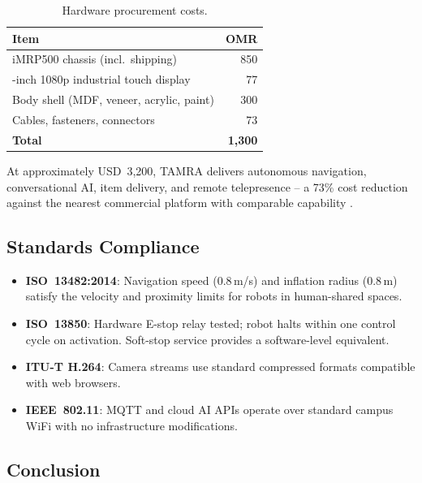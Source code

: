 \begin{table}[H]
\centering
\small
\caption{Hardware procurement costs.}
\label{tab:budget}
\setlength{\tabcolsep}{6pt}
\begin{tabular}{@{} >{\raggedright\arraybackslash}p{6.0cm} r @{}}
\toprule
\textbf{Item} & \textbf{OMR} \\
\midrule
iMRP500 chassis (incl.\ shipping)         & 850 \\
10-inch 1080p industrial touch display    & 77 \\
Body shell (MDF, veneer, acrylic, paint)  & 300 \\
Cables, fasteners, connectors            & 73 \\
\midrule
\textbf{Total}                           & \textbf{1{,}300} \\
\bottomrule
\end{tabular}
\end{table}

\noindent At approximately USD~3{,}200, TAMRA delivers autonomous navigation, conversational AI, item delivery, and remote telepresence -- a 73\% cost reduction against the nearest commercial platform with comparable capability \cite{pudubot2,m2medical}.

\subsection{Standards Compliance}

\begin{itemize}
  \item \textbf{ISO~13482:2014}: Navigation speed (0.8\,m/s) and inflation radius (0.8\,m) satisfy the velocity and proximity limits for robots in human-shared spaces.
  \item \textbf{ISO~13850}: Hardware E-stop relay tested; robot halts within one control cycle on activation. Soft-stop service provides a software-level equivalent.
  \item \textbf{ITU-T H.264}: Camera streams use standard compressed formats compatible with web browsers.
  \item \textbf{IEEE~802.11}: MQTT and cloud AI APIs operate over standard campus WiFi with no infrastructure modifications.
\end{itemize}

\subsection{Conclusion}

